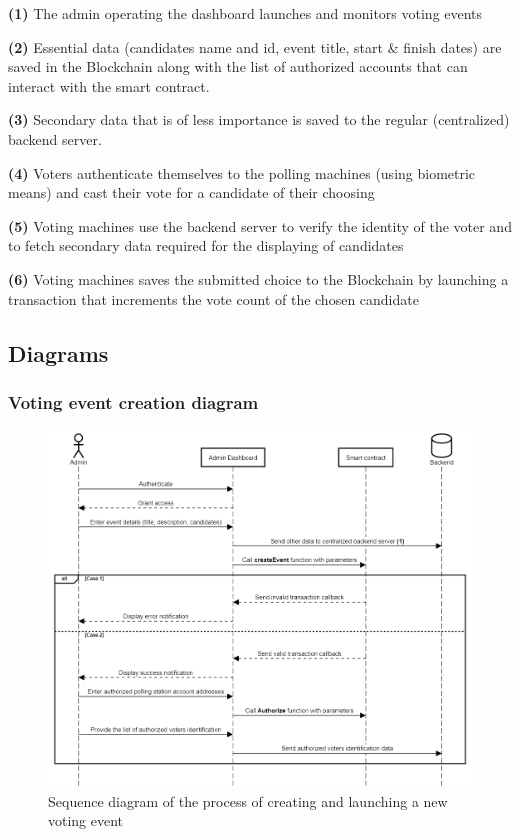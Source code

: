 \begin{list}{}{}
\item \textbf{(1)} The admin operating the dashboard launches and monitors voting events
\item \textbf{(2)} Essential data (candidates name and id, event title, start \& finish dates) are saved in the Blockchain along with the list of authorized accounts that can interact with the smart contract.
\item \textbf{(3)} Secondary data that is of less importance is saved to the regular (centralized) backend server.
\item \textbf{(4)} Voters authenticate themselves to the polling machines (using biometric means) and cast their vote for a candidate of their choosing
\item \textbf{(5)} Voting machines use the backend server to verify the identity of the voter and to fetch secondary data required for the displaying of candidates
\item \textbf{(6)} Voting machines saves the submitted choice to the Blockchain by launching a transaction that increments the vote count of the chosen candidate
\end{list}

\subsection{Diagrams}
\subsubsection{Voting event creation diagram}

\begin{figure}[H]
	\centering
		\includegraphics[width=14cm]{images/chapter3/admin_sequence_diagram.png}
		\caption{{\footnotesize Sequence diagram of the process of creating and launching a new voting event}}
\end{figure}

